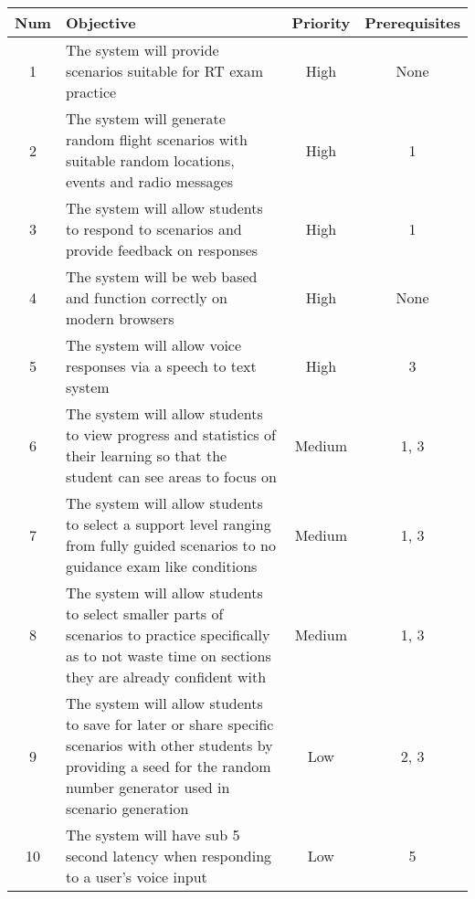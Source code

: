\begin{center}
    \begin{tabular}{ | c | m{24em} | c | c | }
        \hline
        \bf{Num} & \bf{Objective} & \bf{Priority} & \bf{Prerequisites} \\
        \hline
        1 & The system will provide scenarios suitable for RT exam practice & High & None \\
        \hline
        2 & The system will generate random flight scenarios with suitable random locations, events and radio messages & High & 1 \\
        \hline
        3 & The system will allow students to respond to scenarios and provide feedback on responses & High & 1 \\
        \hline
        4 & The system will be web based and function correctly on modern browsers & High & None \\
        \hline
        5 & The system will allow voice responses via a speech to text system & High & 3 \\
        \hline
        6 & The system will allow students to view progress and statistics of their learning so that the student can see areas to focus on & Medium & 1, 3 \\
        \hline
        7 & The system will allow students to select a support level ranging from fully guided scenarios to no guidance exam like conditions & Medium & 1, 3 \\
        \hline
        8 & The system will allow students to select smaller parts of scenarios to practice specifically as to not waste time on sections they are already confident with & Medium & 1, 3 \\
        \hline
        9 & The system will allow students to save for later or share specific scenarios with other students by providing a seed for the random number generator used in scenario generation & Low & 2, 3 \\
        \hline
        10 & The system will have sub 5 second latency when responding to a user's voice input & Low & 5 \\
        \hline
    \end{tabular}
\end{center}